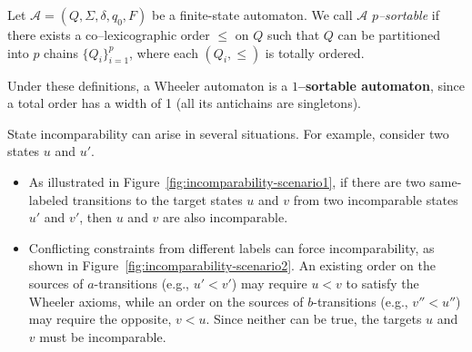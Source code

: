 \begin{definition} \label{def:p-sorable-automaton}
    Let $\mathcal{A} = (Q, \Sigma, \delta, q_0, F)$ be a finite-state automaton. We call $\mathcal{A}$ \emph{$p$--sortable} if there exists a co--lexicographic order $\leq$ on $Q$ such that $Q$ can be partitioned into $p$ chains $\{Q_i\}_{i=1}^p$, where each $(Q_i, \leq)$ is totally ordered.
\end{definition}

Under these definitions, a Wheeler automaton is a \textbf{$1$--sortable automaton}, since a total order has a width of 1 (all its antichains are singletons).

\begin{example} \label{ex:incomparability}
    State incomparability can arise in several situations. For example, consider two states $u$ and $u'$.
    \begin{itemize}
        \item As illustrated in Figure~\ref{fig:incomparability-scenario1}, if there are two same-labeled transitions to the target states $u$ and $v$ from two incomparable states $u'$ and $v'$, then $u$ and $v$ are also incomparable.
        \item Conflicting constraints from different labels can force incomparability, as shown in Figure~\ref{fig:incomparability-scenario2}. An existing order on the sources of $a$-transitions (e.g., $u' < v'$) may require $u < v$ to satisfy the Wheeler axioms, while an order on the sources of $b$-transitions (e.g., $v'' < u''$) may require the opposite, $v < u$. Since neither can be true, the targets $u$ and $v$ must be incomparable.
    \end{itemize}

    \begin{figure}[H]
    \centering
    \begin{subfigure}[b]{0.4\textwidth}
        \centering
\end{subfigure}
\end{figure}
\end{example}

